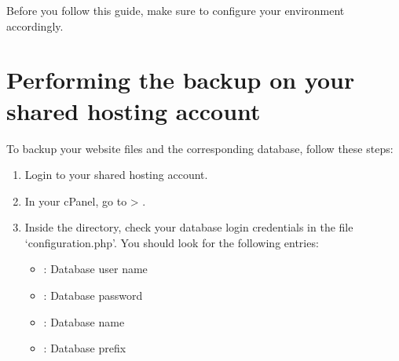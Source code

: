 \documentclass[a4paper,10pt,english,openany,oneside]{sphinxmanual}
\begin{document}
\sphinxAtStartPar
Before you follow this guide, make sure to configure your environment accordingly.


\section{Performing the backup on your shared hosting account}
\label{\detokenize{joomla-to-vps:performing-the-backup-on-your-shared-hosting-account}}\label{\detokenize{joomla-to-vps:credentials}}
\sphinxAtStartPar
To backup your website files and the corresponding database, follow these steps:
\begin{enumerate}
%
\item {} 
\sphinxAtStartPar
Login to your shared hosting account.

\item {} 
\sphinxAtStartPar
In your cPanel, go to  > .
\begin{quote}

\begin{figure}[H]
\centering

\noindent{}
\end{figure}
\end{quote}

\item {} 
\sphinxAtStartPar
Inside the  directory, check your database login credentials in the file ‘configuration.php’. You should look for the following entries:
\begin{itemize}
\item {} 
\sphinxAtStartPar
{}: Database user name

\item {} 
\sphinxAtStartPar
{}: Database password

\item {} 
\sphinxAtStartPar
{}: Database name

\item {} 
\sphinxAtStartPar
{}: Database prefix
\begin{quote}

\begin{figure}[H]
\centering

\noindent{}
\end{figure}
\end{quote}


\end{itemize}
\end{enumerate}
\end{document}
